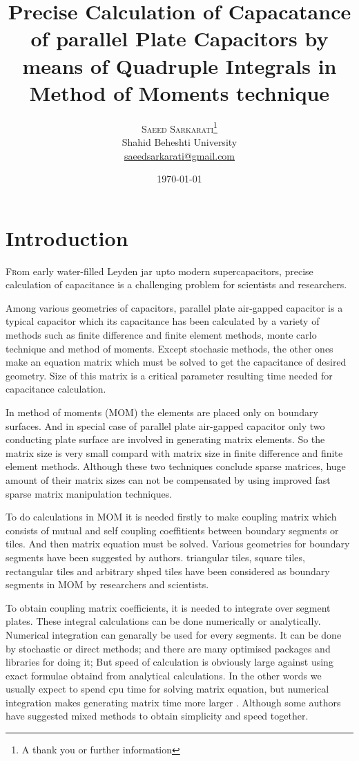 \documentclass[twoside,twocolumn]{article}
\title{Precise Calculation of Capacatance of parallel Plate Capacitors by means of Quadruple Integrals in  Method of Moments technique} %
\author{%
\textsc{Saeed Sarkarati}\thanks{A thank you or further information} \\[1ex] %
\normalsize Shahid Beheshti University \\ %
\normalsize \href{mailto:saeedsarkarati@gmail.com}{saeedsarkarati@gmail.com} %
}
\date{\today} %
\begin{document}
\maketitle


\section{Introduction}

\lettrine[nindent=0em,lines=3]{F} rom early  water-filled Leyden jar upto modern supercapacitors, precise calculation of capacitance is a challenging problem for scientists and researchers.

Among various geometries of capacitors, parallel plate air-gapped capacitor is a typical capacitor which its capacitance has been calculated by a variety of methods such as finite difference and finite element methods, monte carlo technique and method of moments. Except stochasic methods, the other ones make an equation matrix which must be solved to get the capacitance of desired geometry. Size of this matrix is a critical parameter resulting time needed for capacitance calculation.

In method of moments (MOM) the elements are placed only on boundary surfaces. And in special case of parallel plate air-gapped capacitor only two conducting plate surface are involved in generating matrix elements. So the matrix size is very small compard with matrix size in finite difference and finite element methods. Although these two techniques conclude sparse matrices, huge amount of their matrix sizes can not be compensated by using improved fast sparse matrix manipulation techniques. 

To do calculations in MOM it is needed firstly to make coupling matrix which consists of mutual and self coupling coeffitients between boundary segments or tiles. And then matrix equation must be solved. Various geometries for boundary segments have been suggested by authors. triangular tiles, square tiles, rectangular tiles and arbitrary shped tiles have been considered as boundary segments in MOM by researchers and scientists. 

To obtain coupling matrix coefficients, it is needed to integrate over segment plates. These integral calculations can be done numerically or analytically. Numerical integration can genarally be used for every segments. It can be done by stochastic or direct methods; and there are many optimised packages and libraries for doing it; But speed of calculation is obviously large against %
using exact formulae obtaind from analytical calculations. In the other words we usually expect to spend cpu time for solving matrix equation, but numerical integration makes generating matrix time more larger %
. Although some authors have suggested mixed methods to obtain simplicity and speed together.
\end{document}
